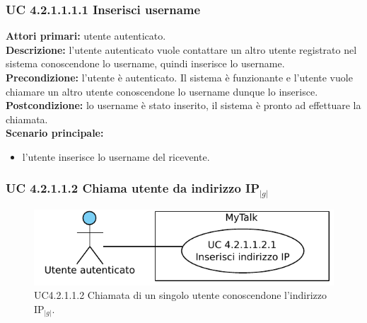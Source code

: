 \subsubsection{UC 4.2.1.1.1.1 Inserisci username}
\noindent
\textbf{Attori primari:} utente autenticato.\\
\textbf{Descrizione:} l'utente autenticato vuole contattare un altro utente registrato nel sistema conoscendone lo username, quindi inserisce lo username.\\
\textbf{Precondizione:} l'utente è autenticato. Il sistema è funzionante e l'utente vuole chiamare un altro utente conoscendone lo username dunque lo inserisce.\\
\textbf{Postcondizione:} lo username è stato inserito, il sistema è pronto ad effettuare la chiamata.\\
\textbf{Scenario principale:}
\begin{itemize}
\item l'utente inserisce lo username del ricevente.
\end{itemize}

\subsubsection{UC 4.2.1.1.2 Chiama utente da indirizzo IP$_{|g|}$}

\begin{figure}[htbp]
\centering
\includegraphics[scale=0.7]{./casi_uso/UC4-2-1-1-2.pdf}
\caption{UC4.2.1.1.2 Chiamata di un singolo utente conoscendone l'indirizzo IP$_{|g|}$.}
\end{figure}

